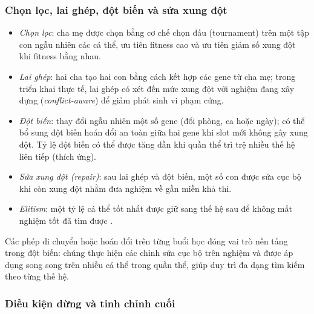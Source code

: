 \documentclass[a4paper,12pt,oneside]{article}
\begin{document}
	\subsubsection{Chọn lọc, lai ghép, đột biến và sửa xung đột}
	
	\begin{itemize}
		\item \textit{Chọn lọc}: cha mẹ được chọn bằng cơ chế chọn đấu (tournament) trên một tập con ngẫu nhiên các cá thể, ưu tiên fitness cao và ưu tiên giảm số xung đột khi fitness bằng nhau.
		\item \textit{Lai ghép}: hai cha tạo hai con bằng cách kết hợp các gene từ cha mẹ; trong triển khai thực tế, lai ghép có xét đến mức xung đột với nghiệm đang xây dựng (\textit{conflict-aware}) để giảm phát sinh vi phạm cứng.
		\item \textit{Đột biến}: thay đổi ngẫu nhiên một số gene (đổi phòng, ca hoặc ngày); có thể bổ sung đột biến hoán đổi an toàn giữa hai gene khi slot mới không gây xung đột. Tỷ lệ đột biến có thể được tăng dần khi quần thể trì trệ nhiều thế hệ liên tiếp (thích ứng).
		\item \textit{Sửa xung đột (repair)}: sau lai ghép và đột biến, một số con được sửa cục bộ khi còn xung đột nhằm đưa nghiệm về gần miền khả thi.
		\item \textit{Elitism}: một tỷ lệ cá thể tốt nhất được giữ sang thế hệ sau để không mất nghiệm tốt đã tìm được \cite{burke1997automated}.
	\end{itemize}
	
	Các phép di chuyển hoặc hoán đổi trên từng buổi học đóng vai trò nền tảng trong đột biến: chúng thực hiện các chỉnh sửa cục bộ trên nghiệm và được áp dụng song song trên nhiều cá thể trong quần thể, giúp duy trì đa dạng tìm kiếm theo từng thế hệ.
	
	\subsubsection{Điều kiện dừng và tinh chỉnh cuối}
	
\end{document}
